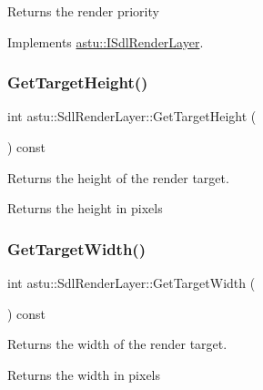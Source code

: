 \begin{DoxyReturn}{Returns}
the render priority 
\end{DoxyReturn}


Implements \hyperlink{classastu_1_1ISdlRenderLayer_a623b411a1afa967bdaa879f5075eec43}{astu\+::\+I\+Sdl\+Render\+Layer}.

\mbox{\label{classastu_1_1SdlRenderLayer_abb71d24b4f8bf008a29f7a313abc74ac}} 
\subsubsection{\texorpdfstring{Get\+Target\+Height()}{GetTargetHeight()}}
{\footnotesize\ttfamily int astu\+::\+Sdl\+Render\+Layer\+::\+Get\+Target\+Height (\begin{DoxyParamCaption}{ }\end{DoxyParamCaption}) const\hspace{0.3cm}{\ttfamily [inline]}}

Returns the height of the render target.

\begin{DoxyReturn}{Returns}
the height in pixels 
\end{DoxyReturn}
\mbox{\label{classastu_1_1SdlRenderLayer_a0351faee7eb27e3564c9337e0411722f}} 
\subsubsection{\texorpdfstring{Get\+Target\+Width()}{GetTargetWidth()}}
{\footnotesize\ttfamily int astu\+::\+Sdl\+Render\+Layer\+::\+Get\+Target\+Width (\begin{DoxyParamCaption}{ }\end{DoxyParamCaption}) const\hspace{0.3cm}{\ttfamily [inline]}}

Returns the width of the render target.

\begin{DoxyReturn}{Returns}
the width in pixels 
\end{DoxyReturn}
\mbox{\label{classastu_1_1SdlRenderLayer_af9b0cfe1797705f509bc18db0c8a5320}} 
